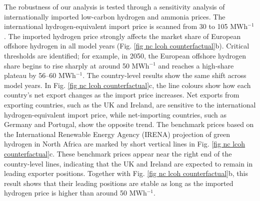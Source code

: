 \documentclass[pdflatex,lineno,sn-mathphys,Numbered]{sn-jnl}%
\begin{document}
The robustness of our analysis is tested through a sensitivity analysis of internationally imported low-carbon hydrogen and ammonia prices. The international hydrogen-equivalent import price is scanned from 30 to 105 \texteuro{} MWh$^{-1}$. The imported hydrogen price strongly affects the market share of European offshore hydrogen in all model years (Fig. \ref{fig nc lcoh counterfactual}b). Critical thresholds are identified; for example, in 2050, the European offshore hydrogen share begins to rise sharply at around 50 \texteuro{} MWh$^{-1}$ and reaches a high-share plateau by 56--60 \texteuro{} MWh$^{-1}$. The country-level results show the same shift across model years. In Fig. \ref{fig nc lcoh counterfactual}c, the line colours show how each country's net export changes as the import price increases. Net exports from exporting countries, such as the UK and Ireland, are sensitive to the international hydrogen-equivalent import price, while net-importing countries, such as Germany and Portugal, show the opposite trend. The benchmark prices based on the International Renewable Energy Agency (IRENA) projection of green hydrogen in North Africa \cite{IRENAGlobalHydrogenTradeOutlook2022} are marked by short vertical lines in Fig. \ref{fig nc lcoh counterfactual}c. These benchmark prices appear near the right end of the country-level lines, indicating that the UK and Ireland are expected to remain in leading exporter positions. Together with Fig. \ref{fig nc lcoh counterfactual}b, this result shows that their leading positions are stable as long as the imported hydrogen price is higher than around 50 \texteuro{} MWh$^{-1}$.
\end{document}
